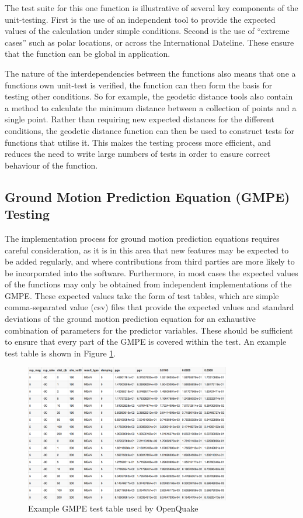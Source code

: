 The test suite for this one function is illustrative of several key components of the unit-testing. First is the use of an independent tool to provide the expected values of the calculation under simple conditions. Second is the use of ``extreme cases'' such as polar locations, or across the International Dateline. These ensure that the function can be global in application. 

The nature of the interdependencies between the functions also means that one a functions own unit-test is verified, the function can then form the basis for testing other conditions. So for example, the geodetic distance tools also contain a method to calculate the minimum distance between a collection of points and a single point. Rather than requiring new expected distances for the different conditions, the geodetic distance function can then be used to construct tests for functions that utilise it. This makes the testing process more efficient, and reduces the need to write large numbers of tests in order to ensure correct behaviour of the function.

\subsection{Ground Motion Prediction Equation (GMPE) Testing}

The implementation process for ground motion prediction equations requires careful consideration, as it is in this area that new features may be expected to be added regularly, and where contributions from third parties are more likely to be incorporated into the software. Furthermore, in most cases the expected values of the functions may only be obtained from independent implementations of the GMPE. These expected values take the form of test tables, which are simple comma-separated value (csv) files that provide the expected values and standard deviations of the ground motion prediction equation for an exhaustive combination of parameters for the predictor variables. These should be sufficient to ensure that every part of the GMPE is covered within the test. An example test table is shown in Figure \ref{fig:gmpe_test_table}.

\begin{figure}[htbp]
  \centering
  \includegraphics[width=0.8\textwidth]{./qareport/pictures/test_tables_screen_capture.pdf}
  \caption{Example GMPE test table used by OpenQuake}
  \label{fig:gmpe_test_table}
\end{figure}

